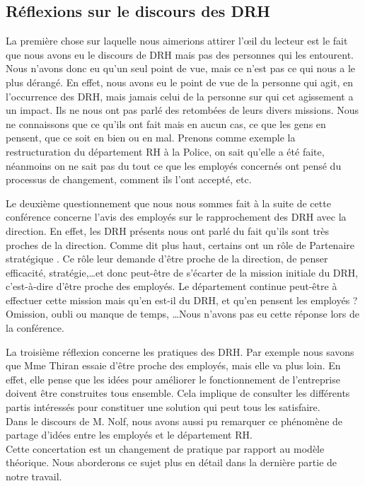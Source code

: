 \subsection{Réflexions sur le discours des DRH}

La première chose sur laquelle nous aimerions attirer l'œil du lecteur est le fait que nous avons eu le discours de DRH mais pas des personnes qui les entourent. Nous n'avons donc eu qu'un seul point de vue, mais ce n'est pas ce qui nous a le plus dérangé. En effet, nous avons eu le point de vue de la personne qui agit, en l'occurrence des DRH, mais jamais celui de la personne sur qui cet agissement a un impact. Ils ne nous ont pas parlé des retombées de leurs divers missions. Nous ne connaissons que ce qu'ils ont fait mais en aucun cas, ce que les gens en pensent, que ce soit en bien ou en mal. Prenons comme exemple la restructuration du département RH à la Police, on sait qu'elle a été faite, néanmoins on ne sait pas du tout ce que les employés concernés ont pensé du processus de changement, comment ils l'ont accepté, etc. \newline 

Le deuxième questionnement que nous nous sommes fait à la suite de cette conférence concerne l'avis des employés sur le rapprochement des DRH avec la direction. En effet, les DRH présents nous ont parlé du fait qu'ils sont très proches de la direction. Comme dit plus haut, certains ont un rôle de \og Partenaire stratégique \fg{}. Ce rôle leur demande d'être proche de la direction, de penser efficacité, stratégie,\ldots et donc peut-être de s'écarter de la mission initiale du DRH, c'est-à-dire d'être proche des employés.
 Le département continue peut-être à effectuer cette mission mais qu'en est-il du DRH, et qu'en pensent les employés ? Omission, oubli ou manque de temps, \ldots Nous n'avons pas eu cette réponse lors de la conférence. \newline

La troisième réflexion concerne les pratiques des DRH. Par exemple nous savons que Mme Thiran essaie d'être proche des employés, mais elle va plus loin. En effet, elle pense que les idées pour améliorer le fonctionnement de l'entreprise doivent être construites tous ensemble. Cela implique de consulter les différents partis intéressés pour constituer une solution qui peut tous les satisfaire. \\
Dans le discours de M. Nolf, nous avons aussi pu remarquer ce phénomène de partage d'idées entre les employés et le département RH.\\
Cette concertation est un changement de pratique par rapport au modèle théorique. Nous aborderons ce sujet plus en détail dans la dernière partie de notre travail.\newline

